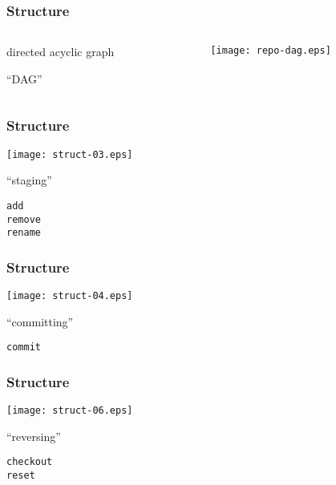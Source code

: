 \documentclass[english]{beamer}
\newcommand{\CMD}[1]{%
\texttt{\textcolor{code-blue}{#1}}%
}
\begin{document}
\begin{frame}
\frametitle{Structure}
\begin{columns}[t]
        \begin{column}[T]{.5\textwidth}
                directed acyclic graph

                \vspace{.1\textheight}
                ``DAG''
        \end{column}
        \begin{column}[T]{.5\textwidth}
                \texttt{[image: repo-dag.eps]}
        \end{column}
\end{columns}

\end{frame}

\begin{frame}
\frametitle{Structure}

\texttt{[image: struct-03.eps]}
\vspace{\baselineskip}
\begin{center}
        ``staging''

        \vspace{\baselineskip}
        \CMD{add} \\
        \CMD{remove} \\
        \CMD{rename}
\end{center}
\vspace{\textheight}
\end{frame}

\begin{frame}
\frametitle{Structure}

\texttt{[image: struct-04.eps]}
\vspace{\baselineskip}
\begin{center}
        ``committing''

        \vspace{\baselineskip}
        \CMD{commit}
\end{center}
\vspace{\textheight}
\end{frame}

\begin{frame}
\frametitle{Structure}

\texttt{[image: struct-06.eps]}
\vspace{\baselineskip}
\begin{center}
        ``reversing''

        \vspace{\baselineskip}
        \CMD{checkout} \\
        \CMD{reset}
\end{center}
\vspace{\textheight}
\end{frame}
\end{document}
